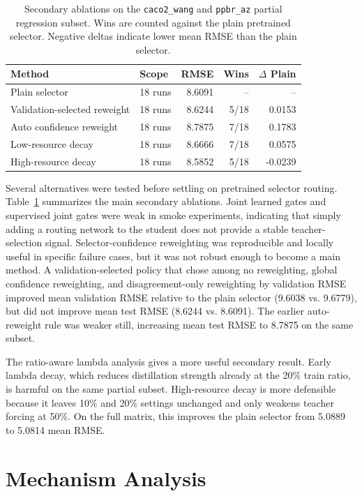 \documentclass[11pt]{article}
\begin{document}
\begin{table}[t]
\centering
\small
\begin{tabular}{llrrr}
\toprule
Method & Scope & RMSE & Wins & \(\Delta\) Plain \\
\midrule
Plain selector & 18 runs & 8.6091 & -- & -- \\
Validation-selected reweight & 18 runs & 8.6244 & 5/18 & 0.0153 \\
Auto confidence reweight & 18 runs & 8.7875 & 7/18 & 0.1783 \\
Low-resource decay & 18 runs & 8.6666 & 7/18 & 0.0575 \\
High-resource decay & 18 runs & 8.5852 & 5/18 & -0.0239 \\
\bottomrule
\end{tabular}
\caption{Secondary ablations on the \texttt{caco2\_wang} and \texttt{ppbr\_az}
partial regression subset. Wins are counted against the plain pretrained
selector. Negative deltas indicate lower mean RMSE than the plain selector.}
\label{tab:secondary_ablation}
\end{table}

Several alternatives were tested before settling on pretrained selector
routing. Table~\ref{tab:secondary_ablation} summarizes the main secondary
ablations. Joint learned gates and supervised joint gates were weak in smoke
experiments, indicating that simply adding a routing network to the student
does not provide a stable teacher-selection signal. Selector-confidence
reweighting was reproducible and locally useful in specific failure cases, but
it was not robust enough to become a main method. A validation-selected policy
that chose among no reweighting, global confidence reweighting, and
disagreement-only reweighting by validation RMSE improved mean validation RMSE
relative to the plain selector (9.6038 vs. 9.6779), but did not improve mean
test RMSE (8.6244 vs. 8.6091). The earlier auto-reweight rule was weaker still,
increasing mean test RMSE to 8.7875 on the same subset.

The ratio-aware lambda analysis gives a more useful secondary result. Early
lambda decay, which reduces distillation strength already at the 20\% train
ratio, is harmful on the same partial subset. High-resource decay is more
defensible because it leaves 10\% and 20\% settings unchanged and only weakens
teacher forcing at 50\%. On the full matrix, this improves the plain selector
from 5.0889 to 5.0814 mean RMSE.

\section{Mechanism Analysis}
\end{document}
